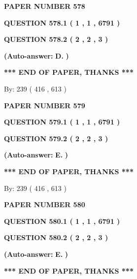 \documentclass[12pt]{article}
\begin{document}
   
 {\textbf{ \Large{ PAPER NUMBER  578  }}}
   
   
   
   
  
  
{\textbf{\large{QUESTION
578.1 
 ( 1 , 1 , 6791 )
}}}
  
  
{\textbf{\large{QUESTION
578.2 
 ( 2 , 2 , 3 )
}}}
 
 
{\textbf{(Auto-answer:}}
{\textbf{\large{
D.}}}
{\textbf{)}}
 
 
   
   
   
   
\vspace{1.0in} 
{\textbf{\large{ *** END OF PAPER, THANKS *** }}} 
   
   
\hspace{1.0in} By: 
 239 ( 416 ,  613 )
   
   
   
   
\newpage 
\setcounter{page}{ 
   579001 } 
   
   
 {\textbf{ \Large{ PAPER NUMBER  579  }}}
   
   
   
   
  
  
{\textbf{\large{QUESTION
579.1 
 ( 1 , 1 , 6791 )
}}}
  
  
{\textbf{\large{QUESTION
579.2 
 ( 2 , 2 , 3 )
}}}
 
 
{\textbf{(Auto-answer:}}
{\textbf{\large{
E.}}}
{\textbf{)}}
 
 
   
   
   
   
\vspace{1.0in} 
{\textbf{\large{ *** END OF PAPER, THANKS *** }}} 
   
   
\hspace{1.0in} By: 
 239 ( 416 ,  613 )
   
   
   
   
\newpage 
\setcounter{page}{ 
   580001 } 
   
   
 {\textbf{ \Large{ PAPER NUMBER  580  }}}
   
   
   
   
  
  
{\textbf{\large{QUESTION
580.1 
 ( 1 , 1 , 6791 )
}}}
  
  
{\textbf{\large{QUESTION
580.2 
 ( 2 , 2 , 3 )
}}}
 
 
{\textbf{(Auto-answer:}}
{\textbf{\large{
E.}}}
{\textbf{)}}
 
 
   
   
   
   
\vspace{1.0in} 
{\textbf{\large{ *** END OF PAPER, THANKS *** }}} 
   
\end{document}
